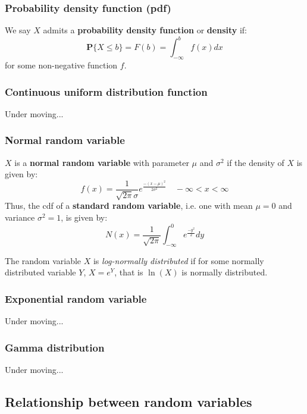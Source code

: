 \subsubsection{Probability density function (pdf)}
We say $X$ admits a \textbf{probability density function} or \textbf{density} if:
\begin{equation}
   \mathbf{P}\{X \leq b\} = F(b) = \int_{-\infty}^b f(x) dx 
\end{equation}
for some non-negative function $f$.


\subsubsection{Continuous uniform distribution function}
Under moving...


\subsubsection{Normal random variable}
$X$ is a \textbf{normal random variable} with parameter $\mu$ and $\sigma^2$ if the density of $X$ is given by:
\begin{equation}
    f(x) = \frac{1}{\sqrt{2\pi}\sigma} e^\frac{-(x-\mu)^2}{2\sigma^2} \quad -\infty < x < \infty
\end{equation}
Thus, the cdf of a \textbf{standard random variable}, i.e. one with mean $\mu = 0$ and variance $\sigma^2 = 1$, is given by:
\begin{equation}
    N(x) = \frac{1}{\sqrt{2\pi}} \int_{-\infty}^{0} e^\frac{-y^2}{2} dy
\end{equation}

The random variable $X$ is \textit{log-normally distributed} if for some normally distributed variable $Y$, $X=e^Y$, that is $\ln(X)$ is normally distributed. 


\subsubsection{Exponential random variable}
Under moving...


\subsubsection{Gamma distribution}
Under moving...



\subsection{Relationship between random variables}
